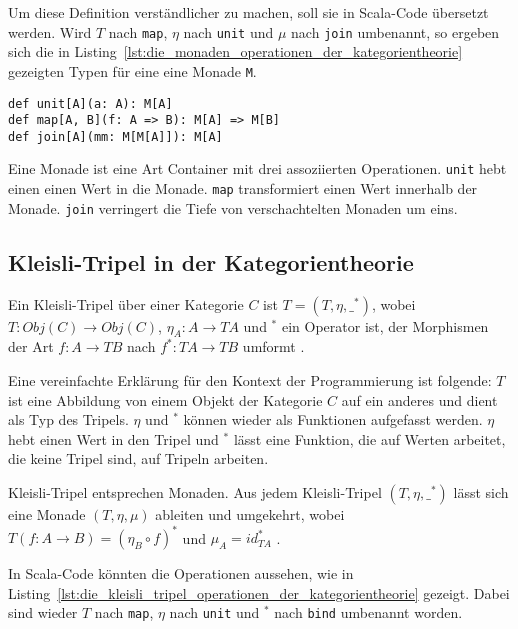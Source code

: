 Um diese Definition verständlicher zu machen, soll sie in Scala-Code übersetzt werden.
Wird $T$ nach \lstinline|map|, $\eta$ nach \lstinline|unit| und $\mu$ nach \lstinline|join| umbenannt, so ergeben sich die in Listing~\ref{lst:die_monaden_operationen_der_kategorientheorie} gezeigten Typen für eine eine Monade \lstinline|M|.

\begin{lstlisting}[caption=Die Monaden-Operationen der Kategorientheorie, label=lst:die_monaden_operationen_der_kategorientheorie]
def unit[A](a: A): M[A]
def map[A, B](f: A => B): M[A] => M[B]
def join[A](mm: M[M[A]]): M[A]
\end{lstlisting}

Eine Monade ist eine Art Container mit drei assoziierten Operationen.
\lstinline|unit| hebt einen einen Wert in die Monade.
\lstinline|map| transformiert einen Wert innerhalb der Monade.
\lstinline|join| verringert die Tiefe von verschachtelten Monaden um eins.


\subsection{Kleisli-Tripel in der Kategorientheorie} %
\label{sub:kleisli_tripel_in_der_kategorientheorie}

Ein Kleisli-Tripel über einer Kategorie $C$ ist $T = (T, \eta, \_^*)$, wobei $T: Obj(C) \to Obj(C)$, $\eta_A: A \to T A$ und $^*$ ein Operator ist, der Morphismen der Art $f: A \to T B$ nach $f^*: T A \to T B$ umformt \cite[vgl.][S.~2]{monads_program_structure}.

Eine vereinfachte Erklärung für den Kontext der Programmierung ist folgende:
$T$ ist eine Abbildung von einem Objekt der Kategorie $C$ auf ein anderes und dient als Typ des Tripels.
$\eta$ und $^*$ können wieder als Funktionen aufgefasst werden.
$\eta$ hebt einen Wert in den Tripel und $^*$ lässt eine Funktion, die auf Werten arbeitet, die keine Tripel sind, auf Tripeln arbeiten.

Kleisli-Tripel entsprechen Monaden.
Aus jedem Kleisli-Tripel $(T, \eta, \_^*)$ lässt sich eine Monade $(T, \eta, \mu)$ ableiten und umgekehrt, wobei $T(f: A \to B) = (\eta_B \circ f)^*$ und $\mu_A = id^*_{T A}$ \cite[vgl.][S.~2]{monads_program_structure}.

In Scala-Code könnten die Operationen aussehen, wie in Listing~\ref{lst:die_kleisli_tripel_operationen_der_kategorientheorie} gezeigt.
Dabei sind wieder $T$ nach \lstinline|map|, $\eta$ nach \lstinline|unit| und $^*$ nach \lstinline|bind| umbenannt worden.

